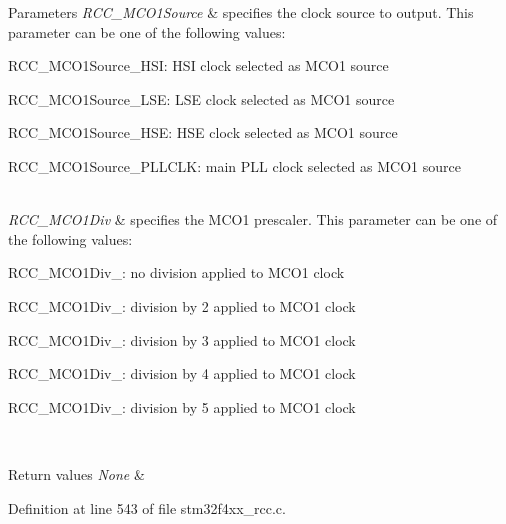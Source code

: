 \begin{DoxyParams}{Parameters}
{\em R\+C\+C\+\_\+\+M\+C\+O1\+Source} & specifies the clock source to output. This parameter can be one of the following values\+: \begin{DoxyItemize}
\item R\+C\+C\+\_\+\+M\+C\+O1\+Source\+\_\+\+H\+SI\+: H\+SI clock selected as M\+C\+O1 source \item R\+C\+C\+\_\+\+M\+C\+O1\+Source\+\_\+\+L\+SE\+: L\+SE clock selected as M\+C\+O1 source \item R\+C\+C\+\_\+\+M\+C\+O1\+Source\+\_\+\+H\+SE\+: H\+SE clock selected as M\+C\+O1 source \item R\+C\+C\+\_\+\+M\+C\+O1\+Source\+\_\+\+P\+L\+L\+C\+LK\+: main P\+LL clock selected as M\+C\+O1 source \end{DoxyItemize}
\\
\hline
{\em R\+C\+C\+\_\+\+M\+C\+O1\+Div} & specifies the M\+C\+O1 prescaler. This parameter can be one of the following values\+: \begin{DoxyItemize}
\item R\+C\+C\+\_\+\+M\+C\+O1\+Div\+\_\+: no division applied to M\+C\+O1 clock \item R\+C\+C\+\_\+\+M\+C\+O1\+Div\+\_\+: division by 2 applied to M\+C\+O1 clock \item R\+C\+C\+\_\+\+M\+C\+O1\+Div\+\_\+: division by 3 applied to M\+C\+O1 clock \item R\+C\+C\+\_\+\+M\+C\+O1\+Div\+\_\+: division by 4 applied to M\+C\+O1 clock \item R\+C\+C\+\_\+\+M\+C\+O1\+Div\+\_\+: division by 5 applied to M\+C\+O1 clock \end{DoxyItemize}
\\
\hline
\end{DoxyParams}

\begin{DoxyRetVals}{Return values}
{\em None} & \\
\hline
\end{DoxyRetVals}


Definition at line 543 of file stm32f4xx\+\_\+rcc.\+c.

\mbox{\label{group___r_c_c___group1_gaf50f10675b747de60c739e44e5c22aee}} 
